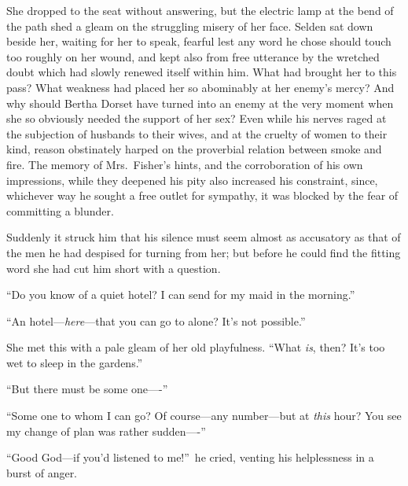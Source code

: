 \documentclass[12pt,a4paper]{book}
\begin{document}
She dropped to the seat without answering, but the electric lamp
at the bend of the path shed a gleam on the struggling misery of
her face. Selden sat down beside her, waiting for her to speak,
fearful lest any word he chose should touch too roughly on her
wound, and kept also from free utterance by the wretched doubt
which had slowly renewed itself within him. What had brought her
to this pass? What weakness had placed her so abominably at her
enemy's mercy? And why should Bertha Dorset have turned into an
enemy at the very moment when she so obviously needed the support
of her sex? Even while his nerves raged at the subjection of husbands
to their wives, and at the cruelty of women to their kind,
reason obstinately harped on the proverbial relation between
smoke and fire. The memory of Mrs.\ Fisher's hints, and the
corroboration of his own impressions, while they deepened his pity
also increased his constraint, since, whichever way he sought a free
outlet for sympathy, it was blocked by the fear of committing a blunder.





Suddenly it struck him that his silence must seem almost as
accusatory as that of the men he had despised for turning from
her; but before he could find the fitting word she had cut him
short with a question.





``Do you know of a quiet hotel? I can send for my maid in the
morning.''





``An hotel---\textit{here}---that you can go to alone? It's not possible.''





She met this with a pale gleam of her old playfulness. ``What \textit{is},
then? It's too wet to sleep in the gardens.''





``But there must be some one----''





``Some one to whom I can go? Of course---any number---but at \textit{this}
hour? You see my change of plan was rather sudden----''





``Good God---if you'd listened to me!''\ he cried, venting his
helplessness in a burst of anger.
\end{document}
